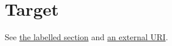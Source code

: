 \documentclass{article}
\begin{document}
\section{Target}\label{sec:target}
See \hyperref[sec:target]{the labelled section} and
\href{https://example.com/}{an external URI}.
\end{document}

